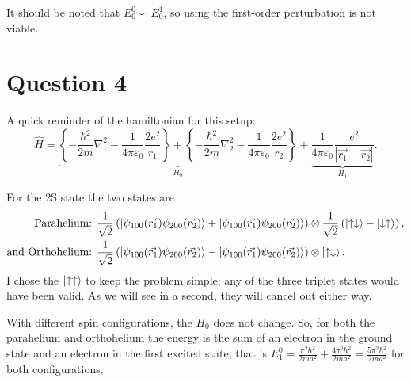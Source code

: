 \documentclass[11pt]{article}
\begin{document}
It should be noted that $E_0^0 \backsim E_0^1$, so using the first-order perturbation is not viable.

\newpage



\section*{Question 4}
A quick reminder of the hamiltonian for this setup:
\[\hat{H} = \underbrace{\left\{-\frac{\hbar^2}{2m}\nabla_1^2 - \frac{1}{4\pi\varepsilon_0}\frac{2e^2}{r_1}\right\} + \left\{-\frac{\hbar^2}{2m}\nabla_2^2 - \frac{1}{4\pi\varepsilon_0}\frac{2e^2}{r_2}\right\}}_{H_0} + \underbrace{\frac{1}{4\pi\varepsilon_0}\frac{e^2}{\left|\vec{r_1} - \vec{r_2}\right|}}_{H_1}.\]

For the 2S state the two states are
\begin{align*}
\text{Parahelium: } & \frac{1}{\sqrt{2}}\left(\ket{\psi_{100}(\vec{r_1})\psi_{200}(\vec{r_2})} + \ket{\psi_{100}(\vec{r_1})\psi_{200}(\vec{r_2})}\right)\otimes \frac{1}{\sqrt{2}}\left(\ket{\uparrow\downarrow} - \ket{\downarrow\uparrow}\right), \\
\text{and Orthohelium: } & \frac{1}{\sqrt{2}}\left(\ket{\psi_{100}(\vec{r_1})\psi_{200}(\vec{r_2})} - \ket{\psi_{100}(\vec{r_1})\psi_{200}(\vec{r_2})}\right)\otimes \ket{\uparrow\downarrow}.
\end{align*}
I chose the $\ket{\uparrow\uparrow}$ to keep the problem simple; any of the three triplet states would have been valid. As we will see in a second, they will cancel out either way.

With different spin configurations, the $H_0$ does not change. So, for both the parahelium and orthohelium the energy is the sum of an electron in the ground state and an electron in the first excited state, that is $\displaystyle{E_1^0 = \frac{\pi^2\hbar^2}{2ma^2} + \frac{4\pi^2\hbar^2}{2ma^2} = \frac{5\pi^2\hbar^2}{2ma^2}}$ for both configurations. 
\end{document}
